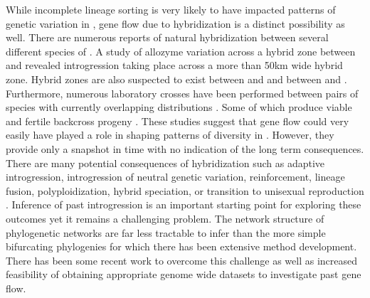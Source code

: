 While incomplete lineage sorting is very likely to have impacted patterns of genetic  
variation in \anaxyrus, gene flow due to hybridization is a distinct possibility as well.
There are numerous reports of natural hybridization between several different 
species of \anaxyrus \parencite{green1996}. 
A study of allozyme variation across a hybrid zone between \americanus and 
\hemiophrys revealed introgression taking place across a more than 50km wide hybrid zone.
Hybrid zones are also suspected to exist between \americanus and \terrestris
and between \woodhousii and \fowleri \parencite{green1996,weatherby1982}.
Furthermore, numerous laboratory crosses have been performed between pairs of \anaxyrus 
species with currently overlapping distributions \parencite{blair1972,blair1963}.
Some of which produce viable and fertile backcross progeny \parencite{blair1972,blair1963}.
These studies suggest that gene flow could very easily have played a role in shaping patterns
of diversity in \anaxyrus. 
However, they provide only a snapshot in time with no indication of the long term 
consequences.
There are many potential consequences of hybridization such as adaptive introgression, 
introgression of neutral genetic variation, reinforcement, lineage fusion, 
polyploidization, hybrid speciation, or transition to unisexual reproduction \parencite{abbott2013}. 
Inference of past introgression is an important starting point for exploring these
outcomes yet it remains a challenging problem. 
The network structure of phylogenetic networks are far less tractable to infer than the 
more simple bifurcating phylogenies for which there has been extensive method development.
There has been some recent work to overcome this challenge as well as increased 
feasibility of obtaining appropriate genome wide datasets to investigate past 
gene flow.


